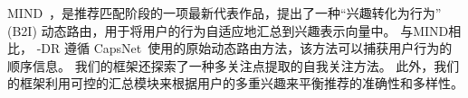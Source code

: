 MIND~\cite{li2019multi}，是推荐匹配阶段的一项最新代表作品，提出了一种“兴趣转化为行为” (B2I) 动态路由，用于将用户的行为自适应地汇总到兴趣表示向量中。 与MIND相比， \model-DR 遵循 CapsNet~\cite{sabour2017dynamic}使用的原始动态路由方法，该方法可以捕获用户行为的顺序信息。 我们的框架还探索了一种多关注点提取的自我关注方法。 此外，我们的框架利用可控的汇总模块来根据用户的多重兴趣来平衡推荐的准确性和多样性。

